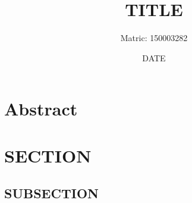 \documentclass[a4paper,11pt]{article}
\title{TITLE}
\author{Matric: 150003282}
\date{DATE}
\begin{document}
	
	\maketitle
	\section*{Abstract}
	
	\pagebreak
	\section{SECTION}
	\subsection{SUBSECTION}
	





	
	\pagebreak

	
	
\end{document}
